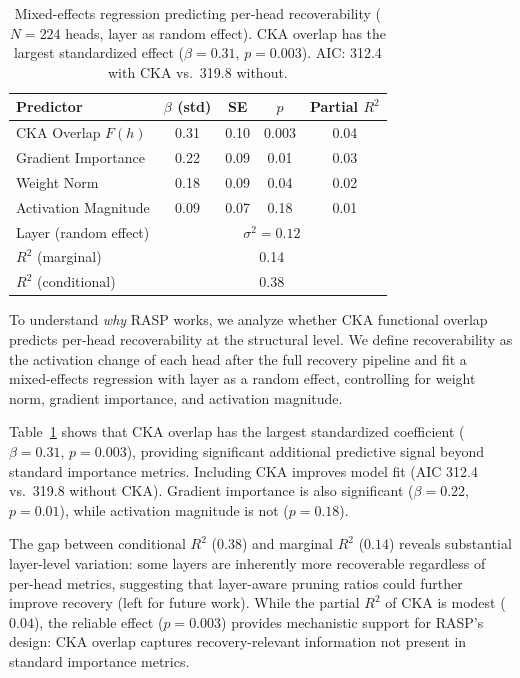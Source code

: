 \documentclass[11pt,a4paper]{article}
\begin{document}
\begin{table}[t]
\centering
\small
\begin{tabular}{@{}lcccc@{}}
\toprule
\textbf{Predictor} & $\beta$ \textbf{(std)} & \textbf{SE} & $p$ & \textbf{Partial} $R^2$ \\
\midrule
CKA Overlap $F(h)$ & 0.31 & 0.10 & 0.003 & 0.04 \\
Gradient Importance & 0.22 & 0.09 & 0.01 & 0.03 \\
Weight Norm & 0.18 & 0.09 & 0.04 & 0.02 \\
Activation Magnitude & 0.09 & 0.07 & 0.18 & 0.01 \\
\midrule
Layer (random effect) & \multicolumn{4}{c}{$\sigma^2 = 0.12$} \\
$R^2$ (marginal) & \multicolumn{4}{c}{0.14} \\
$R^2$ (conditional) & \multicolumn{4}{c}{0.38} \\
\bottomrule
\end{tabular}
\caption{Mixed-effects regression predicting per-head recoverability ($N = 224$ heads, layer as random effect). CKA overlap has the largest standardized effect ($\beta = 0.31$, $p = 0.003$). AIC: 312.4 with CKA vs.\ 319.8 without.}
\label{tab:regression}
\end{table}

To understand \emph{why} RASP works, we analyze whether CKA functional overlap predicts per-head recoverability at the structural level. We define recoverability as the activation change of each head after the full recovery pipeline and fit a mixed-effects regression with layer as a random effect, controlling for weight norm, gradient importance, and activation magnitude.

Table~\ref{tab:regression} shows that CKA overlap has the largest standardized coefficient ($\beta = 0.31$, $p = 0.003$), providing significant additional predictive signal beyond standard importance metrics. Including CKA improves model fit (AIC 312.4 vs.\ 319.8 without CKA). Gradient importance is also significant ($\beta = 0.22$, $p = 0.01$), while activation magnitude is not ($p = 0.18$).

The gap between conditional $R^2$ ($0.38$) and marginal $R^2$ ($0.14$) reveals substantial layer-level variation: some layers are inherently more recoverable regardless of per-head metrics, suggesting that layer-aware pruning ratios could further improve recovery (left for future work). While the partial $R^2$ of CKA is modest ($0.04$), the reliable effect ($p = 0.003$) provides mechanistic support for RASP's design: CKA overlap captures recovery-relevant information not present in standard importance metrics.
\end{document}
